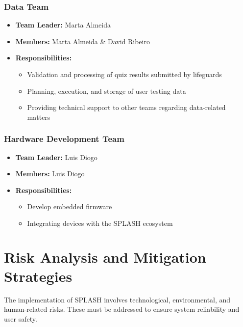 \subsubsection{Data Team}
\begin{itemize}
    \item \textbf{Team Leader:}  Marta Almeida
    \item \textbf{Members:}  Marta Almeida \& David  Ribeiro
    \item \textbf{Responsibilities:}
    \begin{itemize}
        \item Validation and processing of quiz results submitted by lifeguards
        \item Planning, execution, and storage of user testing data
        \item Providing technical support to other teams regarding data-related matters
    \end{itemize}
\end{itemize}
\subsubsection{Hardware Development Team}
\begin{itemize}
    \item \textbf{Team Leader:}  Luis Diogo
    \item \textbf{Members:}  Luis Diogo
    \item \textbf{Responsibilities:}
    \begin{itemize}
        \item Develop embedded firmware
        \item Integrating devices with the SPLASH ecosystem 
    \end{itemize}
\end{itemize}


\section{Risk Analysis and Mitigation Strategies}
\label{section:risk_analisys_mitigation_strategies}

The implementation of SPLASH involves technological, environmental, and human-related risks. These must be addressed to ensure system reliability and user safety.

